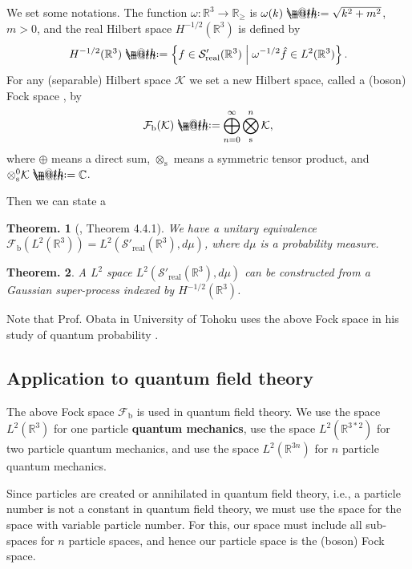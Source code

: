 \documentclass[openany, a4paper, oneside]{jsbook}
\makeatletter
\newcommand*{\defeq}{\mathrel{\rlap{%
\raisebox{0.3ex}{$\m@th\cdot$}}%
\raisebox{-0.3ex}{$\m@th\cdot$}}%
=}
\theoremstyle{break}
\theoremstyle{breakdefn}
\newtheorem{thm}{Theorem.}[section]
\newcommand{\relmiddle}[1]{\mathrel{}\middle#1\mathrel{}}
\newcommand{\set}[2]{\left\{#1 \relmiddle| #2\right\}}
\newcommand{\calFb}{\mathcal{F}_{\mathrm{b}}}
\newcommand{\calK}{\mathcal{K}}
\newcommand{\realtempereddist}{\mathcal{S}'_{\mathrm{real}}}
\makeatother
\begin{document}
We set some notations.
The function $\omega \colon \mathbb{R}^3 \to \mathbb{R}_{\geq}$ is $\omega (k) \defeq \sqrt{k^2 + m^2}$, $m > 0$,
and the real Hilbert space $H^{-1/2} (\mathbb{R}^3)$ is defined by
\begin{align}
 H^{-1/2} (\mathbb{R}^3)
 \defeq
 \set{f \in \realtempereddist (\mathbb{R}^3)}{\omega^{-1/2} \hat{f} \in L^2 (\mathbb{R}^3)}.
\end{align}
For any (separable) Hilbert space $\calK$ we set a new Hilbert space, called a (boson) Fock space \cite{AsaoArai1, AsaoArai2}, by
\begin{align}
 \calFb (\calK)
 \defeq
 \bigoplus_{n=0}^{\infty} \bigotimes_{\mathrm{s}}^n \calK,
\end{align}
where $\oplus$ means a direct sum, $\otimes_{\mathrm{s}}$ means a symmetric tensor product,
and  $\otimes_{\mathrm{s}}^0 \calK \defeq \mathbb{C}$.

Then we can state a
\begin{thm}[\cite{AraiEzawa3}, Theorem 4.4.1]
 We have a unitary equivalence $\calFb (L^2 (\mathbb{R}^3)) = L^2 (\realtempereddist (\mathbb{R}^3), d \mu)$,
 where $d \mu$ is a probability measure.
\end{thm}
\begin{thm}
 A $L^2$ space $L^2 (\realtempereddist (\mathbb{R}^3), d \mu)$ can be constructed from a Gaussian super-process indexed by $H^{-1/2} (\mathbb{R}^3)$.
\end{thm}

Note that Prof. Obata in University of Tohoku uses the above Fock space in his study of quantum probability \cite{AccardiObata1}.
\subsection{Application to quantum field theory \cite{AsaoArai1, AsaoArai2}}


The above Fock space $\calFb$ is used in quantum field theory.
We use the space $L^2 (\mathbb{R}^3)$ for one particle \textbf{quantum mechanics},
use the space $L^2 (\mathbb{R}^{3*2})$ for two particle quantum mechanics,
and use the space $L^2 (\mathbb{R}^{3n})$ for $n$ particle quantum mechanics.

Since particles are created or annihilated in quantum field theory, i.e.,
a particle number is not a constant in quantum field theory,
we must use the space for the space with variable particle number.
For this, our space must include all sub-spaces for $n$ particle spaces,
and hence our particle space is the (boson) Fock space.
\end{document}
